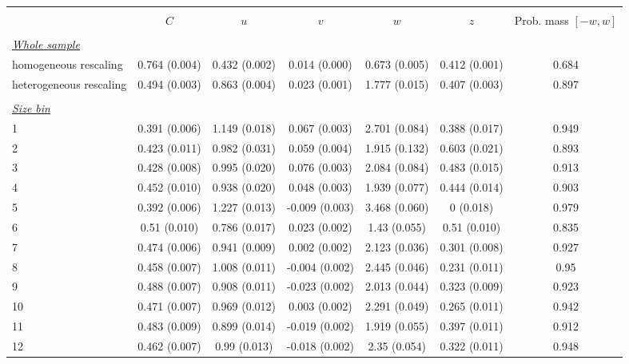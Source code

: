 
\begin{tabular}{@{\extracolsep{5pt}} l cccccc} 
\\[-1.8ex]\hline 
\hline \\[-1.8ex] 
 & $C$ & $u$ & $v$ & $w$ & $z$ & Prob. mass $[-w,w]$ \\ 
\hline \\[-1.8ex] 
\underline{{\it Whole sample}} &   &   &   &   &   &  \\ 
homogeneous rescaling & 0.764 (0.004) & 0.432 (0.002) & 0.014 (0.000) & 0.673 (0.005) & 0.412 (0.001) & 0.684 \\ 
heterogeneous rescaling & 0.494 (0.003) & 0.863 (0.004) & 0.023 (0.001) & 1.777 (0.015) & 0.407 (0.003) & 0.897 \\ 
 &   &   &   &   &   &  \\ 
\underline{{\it Size bin}} &   &   &   &   &   &  \\ 
1 & 0.391 (0.006) & 1.149 (0.018) & 0.067 (0.003) & 2.701 (0.084) & 0.388 (0.017) & 0.949 \\ 
2 & 0.423 (0.011) & 0.982 (0.031) & 0.059 (0.004) & 1.915 (0.132) & 0.603 (0.021) & 0.893 \\ 
3 & 0.428 (0.008) & 0.995 (0.020) & 0.076 (0.003) & 2.084 (0.084) & 0.483 (0.015) & 0.913 \\ 
4 & 0.452 (0.010) & 0.938 (0.020) & 0.048 (0.003) & 1.939 (0.077) & 0.444 (0.014) & 0.903 \\ 
5 & 0.392 (0.006) & 1.227 (0.013) & -0.009 (0.003) & 3.468 (0.060) & 0 (0.018) & 0.979 \\ 
6 & 0.51 (0.010) & 0.786 (0.017) & 0.023 (0.002) & 1.43 (0.055) & 0.51 (0.010) & 0.835 \\ 
7 & 0.474 (0.006) & 0.941 (0.009) & 0.002 (0.002) & 2.123 (0.036) & 0.301 (0.008) & 0.927 \\ 
8 & 0.458 (0.007) & 1.008 (0.011) & -0.004 (0.002) & 2.445 (0.046) & 0.231 (0.011) & 0.95 \\ 
9 & 0.488 (0.007) & 0.908 (0.011) & -0.023 (0.002) & 2.013 (0.044) & 0.323 (0.009) & 0.923 \\ 
10 & 0.471 (0.007) & 0.969 (0.012) & 0.003 (0.002) & 2.291 (0.049) & 0.265 (0.011) & 0.942 \\ 
11 & 0.483 (0.009) & 0.899 (0.014) & -0.019 (0.002) & 1.919 (0.055) & 0.397 (0.011) & 0.912 \\ 
12 & 0.462 (0.007) & 0.99 (0.013) & -0.018 (0.002) & 2.35 (0.054) & 0.322 (0.011) & 0.948 \\ 

\end{tabular}
